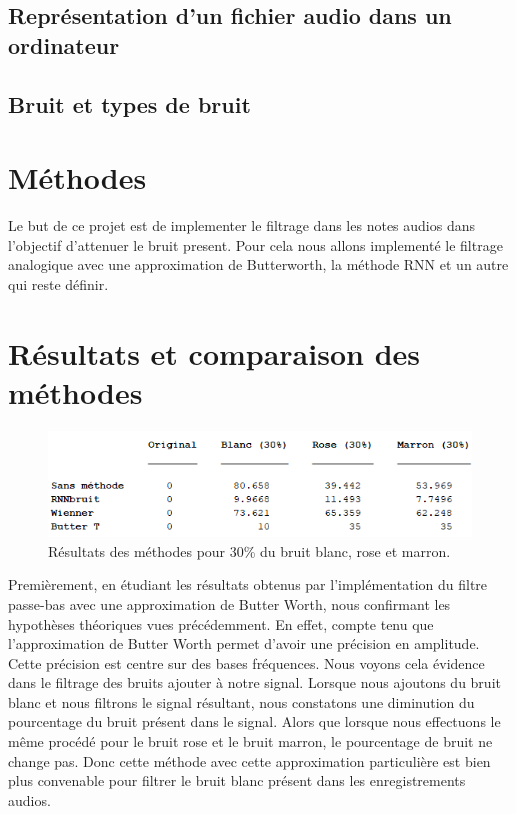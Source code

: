 \documentclass[conference,onecolumn]{IEEEtran}
\begin{document}
\subsection{Représentation d’un fichier audio dans un ordinateur}

\subsection{Bruit et types de bruit}

\section{Méthodes}
Le but de ce projet est de implementer le filtrage dans les notes audios dans l'objectif d'attenuer le bruit present. Pour cela nous allons implementé le filtrage analogique avec une approximation de Butterworth, la méthode RNN et un autre qui reste définir.

\section{Résultats et comparaison des méthodes}

\begin{figure}[htp]
    \centering
    \includegraphics[width=15cm]{Tabla.png}
    \caption{Résultats des méthodes pour 30\% du bruit blanc, rose et marron.}
    \label{fig:Résultats}
\end{figure}

Premièrement, en étudiant les résultats obtenus par l'implémentation du filtre passe-bas avec une approximation de Butter Worth, nous confirmant les hypothèses théoriques vues précédemment. En effet, compte tenu que l’approximation de Butter Worth permet d’avoir une précision en amplitude. Cette précision est centre sur des bases fréquences. Nous voyons cela évidence dans le filtrage des bruits ajouter à notre signal. Lorsque nous ajoutons du bruit blanc et nous filtrons le signal résultant, nous constatons une diminution du pourcentage du bruit présent dans le signal. Alors que lorsque nous effectuons le même procédé pour le bruit rose et le bruit marron, le pourcentage de bruit ne change pas. Donc cette méthode avec cette approximation particulière est bien plus convenable pour filtrer le bruit blanc présent dans les enregistrements audios.
\end{document}
